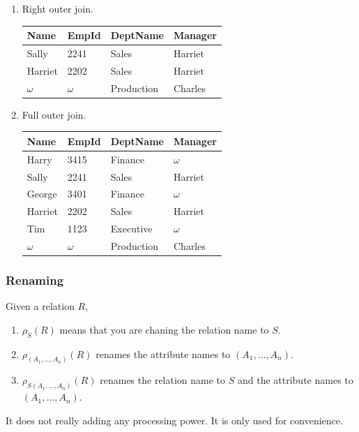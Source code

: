 \documentclass{article}
\begin{document}
\begin{example}
\begin{enumerate}
          \item Right outer join. 

          \begin{center}
            \begin{tabular}{|l|l|l|l|}
            \hline
            Name & EmpId & DeptName & Manager \\
            \hline
            Sally & 2241 & Sales & Harriet \\
            Harriet & 2202 & Sales & Harriet \\
            $\omega$ & $\omega$ & Production & Charles \\
            \hline
            \end{tabular}
          \end{center}

          \item Full outer join. 
          \begin{center}
            \begin{tabular}{|l|l|l|l|}
            \hline
            Name & EmpId & DeptName & Manager \\
            \hline
            Harry & 3415 & Finance & $\omega$ \\
            Sally & 2241 & Sales & Harriet \\
            George & 3401 & Finance & $\omega$ \\
            Harriet & 2202 & Sales & Harriet \\
            Tim & 1123 & Executive & $\omega$ \\
            $\omega$ & $\omega$ & Production & Charles \\
            \hline
            \end{tabular}
          \end{center}
        \end{enumerate}
      \end{example}

    \subsubsection{Renaming}

      \begin{definition}[Renaming]
        Given a relation $R$, 
        \begin{enumerate}
          \item $\rho_S (R)$ means that you are chaning the relation name to $S$. 
          \item $\rho_{(A_1, \ldots, A_n)} (R)$ renames the attribute names to $(A_1, \ldots, A_n)$. 
          \item $\rho_{S(A_1, \ldots, A_n)} (R)$ renames the relation name to $S$ and the attribute names to $(A_1, \ldots, A_n)$. 
        \end{enumerate}
        It does not really adding any processing power. It is only used for convenience. 
      \end{definition}
\end{document}
